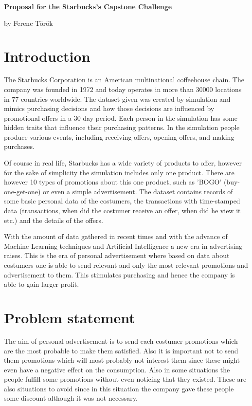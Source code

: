 \documentclass[10pt,oneside,a4paper]{report}
\begin{document}
	
\begin{center}
\huge \textbf{Proposal for the Starbucks's Capstone Challenge}

\Large by Ferenc Török
\end{center}

\section*{Introduction}

The Starbucks Corporation is an American multinational coffeehouse chain. The company was founded in 1972 and today operates in more than 30000 locations in 77 countries worldwide. The dataset given was created by simulation and mimics purchasing decisions and how those decisions are influenced by promotional offers in a 30 day period. Each person in the simulation has some hidden traits that influence their purchasing patterns. In the simulation people produce various events, including receiving offers, opening offers, and making purchases.

Of course in real life, Starbucks has a wide variety of products to offer, however for the sake of simplicity the simulation includes only one product. There are however 10 types of promotions about this one product, such as 'BOGO' (buy-one-get-one) or even a simple advertisement. The dataset contains records of some basic personal data of the costumers, the transactions with time-stamped data (transactions, when did the costumer receive an offer, when did he view it etc.) and the details of the offers. 

With the amount of data gathered in recent times and with the advance of Machine Learning techniques and Artificial Intelligence a new era in advertising raises. This is the era of personal advertisement where based on data about costumers one is able to send relevant and only the most relevant promotions and advertisement to them. This stimulates purchasing and hence the company is able to gain larger profit.

\section*{Problem statement}

The aim of personal advertisement is to send each costumer promotions which are the most probable to make them satisfied. Also it is important not to send them promotions which will most probably not interest them since these might even have a negative effect on the consumption. Also in some situations the people fulfill some promotions without even noticing that they existed. These are also situations to avoid since in this situation the company gave these people some discount although it was not necessary.
\end{document}
